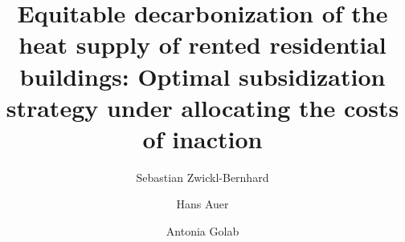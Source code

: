\documentclass[review]{elsarticle}
\begin{document}
\begin{frontmatter}

\title{Equitable decarbonization of the heat supply of rented residential buildings: Optimal subsidization strategy under allocating the costs of inaction}
\author[1]{Sebastian Zwickl-Bernhard}
\author[1]{Hans Auer}
\author[1]{Antonia Golab}
\address[1]{Energy Economics Group (EEG), Technische Universität Wien, Gusshausstrasse 25-29/E370-3, 1040 Wien, Austria}

\begin{abstract}

\end{abstract}

\begin{keyword}
	
\end{keyword}
\end{frontmatter}

\newpage
\end{document}
